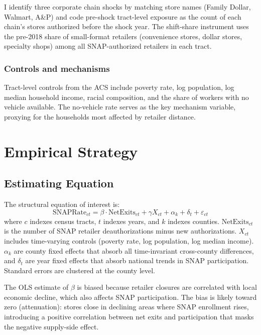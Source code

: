 \documentclass[12pt]{article}
\begin{document}
I identify three corporate chain shocks by matching store names (Family Dollar, Walmart, A\&P) and code pre-shock tract-level exposure as the count of each chain's stores authorized before the shock year. The shift-share instrument uses the pre-2018 share of small-format retailers (convenience stores, dollar stores, specialty shops) among all SNAP-authorized retailers in each tract.

\subsubsection*{Controls and mechanisms} Tract-level controls from the ACS include poverty rate, log population, log median household income, racial composition, and the share of workers with no vehicle available. The no-vehicle rate serves as the key mechanism variable, proxying for the households most affected by retailer distance.




\section{Empirical Strategy}
\label{sec:strategy}

\subsection{Estimating Equation}

The structural equation of interest is:
\begin{equation}
\text{SNAPRate}_{ct} = \beta \cdot \text{NetExits}_{ct} + \gamma X_{ct} + \alpha_k + \delta_t + \varepsilon_{ct}
\label{eq:structural}
\end{equation}
where $c$ indexes census tracts, $t$ indexes years, and $k$ indexes counties. $\text{NetExits}_{ct}$ is the number of SNAP retailer deauthorizations minus new authorizations. $X_{ct}$ includes time-varying controls (poverty rate, log population, log median income). $\alpha_k$ are county fixed effects that absorb all time-invariant cross-county differences, and $\delta_t$ are year fixed effects that absorb national trends in SNAP participation. Standard errors are clustered at the county level.

The OLS estimate of $\beta$ is biased because retailer closures are correlated with local economic decline, which also affects SNAP participation. The bias is likely toward zero (attenuation): stores close in declining areas where SNAP enrollment rises, introducing a positive correlation between net exits and participation that masks the negative supply-side effect.
\end{document}
